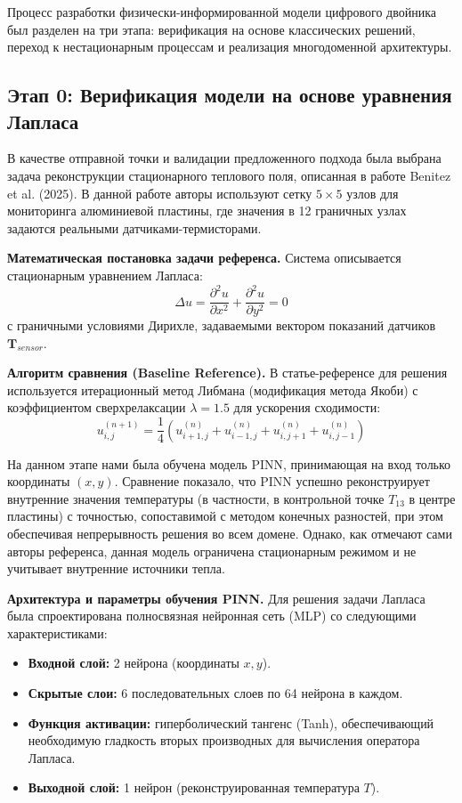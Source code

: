 \documentclass[conference]{IEEEtran}
\begin{document}
Процесс разработки физически-информированной модели цифрового двойника был разделен на три этапа: верификация на основе классических решений, переход к нестационарным процессам и реализация многодоменной архитектуры.

\subsection{Этап 0: Верификация модели на основе уравнения Лапласа}

В качестве отправной точки и валидации предложенного подхода была выбрана задача реконструкции стационарного теплового поля, описанная в работе Benitez et al. (2025). В данной работе авторы используют сетку $5 \times 5$ узлов для мониторинга алюминиевой пластины, где значения в 12 граничных узлах задаются реальными датчиками-термисторами.

\textbf{Математическая постановка задачи референса.} Система описывается стационарным уравнением Лапласа:
\begin{equation}
    \Delta u = \frac{\partial^2 u}{\partial x^2} + \frac{\partial^2 u}{\partial y^2} = 0
\end{equation}
с граничными условиями Дирихле, задаваемыми вектором показаний датчиков $\mathbf{T}_{sensor}$.

\textbf{Алгоритм сравнения (Baseline Reference).} В статье-референсе для решения используется итерационный метод Либмана (модификация метода Якоби) с коэффициентом сверхрелаксации $\lambda = 1.5$ для ускорения сходимости:
\begin{equation}
    u_{i,j}^{(n+1)} = \frac{1}{4} \left( u_{i+1,j}^{(n)} + u_{i-1,j}^{(n)} + u_{i,j+1}^{(n)} + u_{i,j-1}^{(n)} \right)
\end{equation}

На данном этапе нами была обучена модель PINN, принимающая на вход только координаты $(x, y)$. Сравнение показало, что PINN успешно реконструирует внутренние значения температуры (в частности, в контрольной точке $T_{13}$ в центре пластины) с точностью, сопоставимой с методом конечных разностей, при этом обеспечивая непрерывность решения во всем домене. Однако, как отмечают сами авторы референса, данная модель ограничена стационарным режимом и не учитывает внутренние источники тепла.

\textbf{Архитектура и параметры обучения PINN.} Для решения задачи Лапласа была спроектирована полносвязная нейронная сеть (MLP) со следующими характеристиками:
\begin{itemize}
    \item \textbf{Входной слой:} 2 нейрона (координаты $x, y$).
    \item \textbf{Скрытые слои:} 6 последовательных слоев по 64 нейрона в каждом.
    \item \textbf{Функция активации:} гиперболический тангенс (Tanh), обеспечивающий необходимую гладкость вторых производных для вычисления оператора Лапласа.
    \item \textbf{Выходной слой:} 1 нейрон (реконструированная температура $T$).
\end{itemize}
\end{document}
